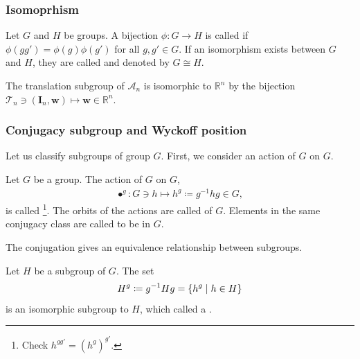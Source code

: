 \subsubsection{Isomoprhism}

\begin{screen}
  \begin{defn}[isomorphism]
    Let $G$ and $H$ be groups.
    A bijection $\phi: G \to H$ is called  if $\phi(gg') = \phi(g) \phi(g')$ for all $g, g' \in G$.
    If an isomorphism exists between $G$ and $H$, they are called  and denoted by $G \cong H$.
  \end{defn}
\end{screen}

The translation subgroup of $\mathcal{A}_{n}$ is isomorphic to $\mathbb{R}^{n}$ by the bijection $\mathcal{T}_{n} \ni (\bm{I}_{n}, \bm{w}) \mapsto \bm{w} \in \mathbb{R}^{n}$.

\subsubsection{Conjugacy subgroup and Wyckoff position}

Let us classify subgroups of group $G$.
First, we consider an action of $G$ on $G$.
\begin{screen}
  \begin{defn}[conjugation]
    Let $G$ be a group.
    The action of $G$ on $G$,
    \begin{align}
      \bullet^{g}: G \ni h \mapsto h^{g} \coloneqq g^{-1} h g \in G,
    \end{align}
    is called \footnote{
      Check $h^{gg'} = (h^{g})^{g'}$.
    }.
    The orbits of the actions are called  of $G$.
    Elements in the same conjugacy class are called to be  in $G$.
  \end{defn}
\end{screen}

The conjugation gives an equivalence relationship between subgroups.
\begin{screen}
  \begin{defn}
    Let $H$ be a subgroup of $G$.
    The set
    \begin{align}
      H^{g} \coloneqq g^{-1} H g = \left\{  h^{g}  \mathrel{}\middle|\mathrel{}  h \in H \right\}
    \end{align}
    is an isomorphic subgroup to $H$, which called a .
  \end{defn}
\end{screen}

